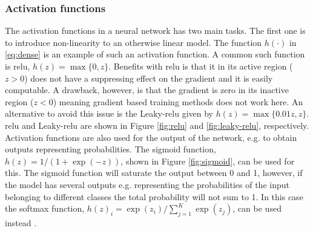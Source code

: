 
\subsubsection{Activation functions}
The activation functions in a neural network has two main tasks. The first one is to introduce non-linearity to an otherwise linear model. The function $h(\cdot)$ in \eqref{eq:dense} is an example of such an activation function. A common such function is \gls{relu}, $h(z) = \max\{0,z\}$. Benefits with \gls{relu} is that it in its active region ($z>0$) does not have a suppressing effect on the gradient and it is easily computable. A drawback, however, is that the gradient is zero in its inactive region ($z < 0$) meaning gradient based training methods does not work here. An alternative to avoid this issue is the Leaky-\gls{relu} given by $h(z) = \max\{0.01 z, z\}$.
\gls{relu} and Leaky-\gls{relu} are shown in Figure \ref{fig:relu} and \ref{fig:leaky-relu}, respectively. Activation functions are also used for the output of the network, e.g. to obtain outputs representing probabilities. The sigmoid function, $h(z) = 1/(1+\exp(-z))$, shown in Figure \ref{fig:sigmoid}, can be used for this.
The sigmoid function will saturate the output between 0 and 1, however, if the model has several outputs e.g. representing the probabilities of the input belonging to different classes the total probability will not sum to 1. In this case the softmax function, $h(z)_i = \exp(z_i)/\sum_{j=1}^K \exp(z_j)$, can be used instead \cite{Goodfellow2016}. %

